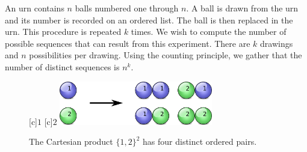 \begin{example}
An urn contains $n$ balls numbered one through $n$.
A ball is drawn from the urn and its number is recorded on an ordered list.
The ball is then replaced in the urn.
This procedure is repeated $k$ times.
We wish to compute the number of possible sequences that can result from this experiment.
There are $k$ drawings and $n$ possibilities per drawing.
Using the counting principle, we gather that the number of distinct sequences is $n^k$.

\begin{figure}[htb!]
\begin{center}
\begin{psfrags}
[c]{$1$}
[c]{$2$}
\includegraphics[height=1.91cm]{Figures/4Chapter/sequences}
\end{psfrags}
\caption{The Cartesian product $\{ 1, 2 \}^2$ has four distinct ordered pairs.}
\label{figure:Sequences}
\end{center}
\end{figure}
\end{example}

